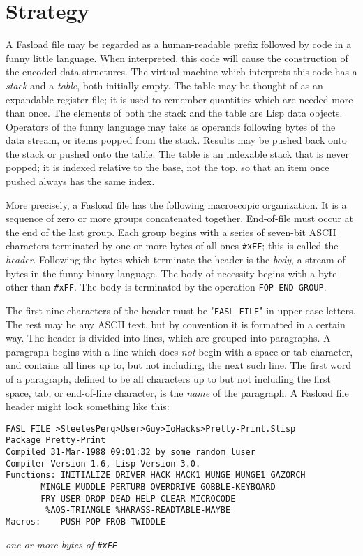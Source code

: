 \section{Strategy}

A Fasload file may be regarded as a human-readable prefix followed by
code in a funny little language.  When interpreted, this code will
cause the construction of the encoded data structures.  The virtual
machine which interprets this code has a {\it stack} and a {\it table},
both initially empty.  The table may be thought of as an expandable
register file; it is used to remember quantities which are needed
more than once.  The elements of both the stack and the table are
Lisp data objects.  Operators of the funny language may take as
operands following bytes of the data stream, or items popped from the
stack.  Results may be pushed back onto the stack or pushed onto the
table.  The table is an indexable stack that is never popped; it is
indexed relative to the base, not the top, so that an item once
pushed always has the same index.

More precisely, a Fasload file has the following macroscopic
organization.  It is a sequence of zero or more groups concatenated
together.  End-of-file must occur at the end of the last group.  Each
group begins with a series of seven-bit ASCII characters terminated
by one or more bytes of all ones \verb|#xFF|; this is called the
{\it header}.  Following the bytes which terminate the header is the
{\it body}, a stream of bytes in the funny binary language.  The body
of necessity begins with a byte other than \verb|#xFF|.  The body is
terminated by the operation {\tt FOP-END-GROUP}.

The first nine characters of the header must be "{\tt FASL FILE}" in
upper-case letters.  The rest may be any ASCII text, but by
convention it is formatted in a certain way.  The header is divided
into lines, which are grouped into paragraphs.  A paragraph begins
with a line which does {\it not} begin with a space or tab character,
and contains all lines up to, but not including, the next such line.
The first word of a paragraph, defined to be all characters up to but
not including the first space, tab, or end-of-line character, is the
{\it name} of the paragraph.  A Fasload file header might look something like
this:
\begin{verbatim}
FASL FILE >SteelesPerq>User>Guy>IoHacks>Pretty-Print.Slisp
Package Pretty-Print
Compiled 31-Mar-1988 09:01:32 by some random luser
Compiler Version 1.6, Lisp Version 3.0.
Functions: INITIALIZE DRIVER HACK HACK1 MUNGE MUNGE1 GAZORCH
	   MINGLE MUDDLE PERTURB OVERDRIVE GOBBLE-KEYBOARD
	   FRY-USER DROP-DEAD HELP CLEAR-MICROCODE
	    %AOS-TRIANGLE %HARASS-READTABLE-MAYBE
Macros:    PUSH POP FROB TWIDDLE
\end{verbatim}
{\it one or more bytes of \verb|#xFF|}

